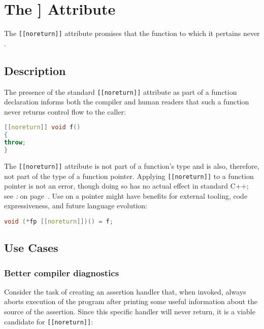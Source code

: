 \newpage
\section[The {\tt [[noreturn]]} Attribute]{The {\SecCode [[noreturn]]} Attribute}\label{the-noreturn-attribute}



The \texttt{[[noreturn]]} attribute promises that the function to which
it pertains never .

\subsection[Description]{Description}\label{description}

The presence of the standard \texttt{[[noreturn]]} attribute as part of
a function declaration informs both the compiler and human readers that
such a function never returns control flow to the caller:

\begin{lstlisting}[language=C++]
[[noreturn]] void f()
{
throw;
}
\end{lstlisting}

\noindent The \texttt{[[noreturn]]} attribute is not part of a function's type
and is also, therefore, not part of the type of a function pointer. Applying \texttt{[[noreturn]]} to a function
pointer is not an error, though doing so has no actual effect in standard C++; see
{\it{}: } on page~\pageref{misuse-of-[[noreturn]]-on-function-pointers}. Use on a pointer might have
benefits for external tooling, code expressiveness, and future language
evolution:

\begin{lstlisting}[language=C++]
void (*fp [[noreturn]])() = f;
\end{lstlisting}


\subsection[Use Cases]{Use Cases}\label{use-cases}

\subsubsection[Better compiler diagnostics]{Better compiler diagnostics}\label{better-compiler-diagnostics}

Consider the task of creating an assertion handler that, when invoked,
always aborts execution of the program after printing some useful
information about the source of the assertion. Since this specific
handler will never return, it is a viable candidate for
\texttt{[[noreturn]]}:

